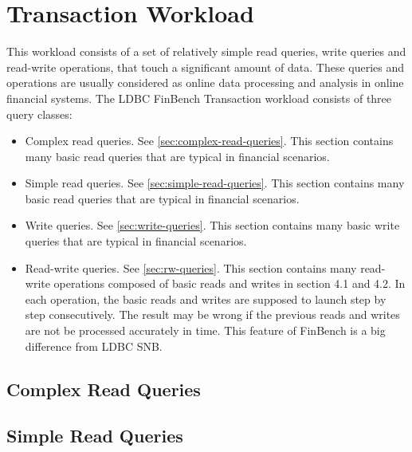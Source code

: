 \chapter{Transaction Workload}
\label{sec:transaction-workload}

This workload consists of a set of relatively simple read queries, write queries
and read-write operations, that touch a significant amount of data. These
queries and operations are usually considered as online data processing and
analysis in online financial systems. The LDBC FinBench Transaction workload consists of three query classes: 
\begin{itemize}
    \item Complex read queries. See \autoref{sec:complex-read-queries}. This section contains many basic read
    queries that are typical in financial scenarios.
    \item Simple read queries. See \autoref{sec:simple-read-queries}. This section contains many basic read
    queries that are typical in financial scenarios.
    \item Write queries. See \autoref{sec:write-queries}. This section contains many basic
    write queries that are typical in financial scenarios.
    \item Read-write queries. See \autoref{sec:rw-queries}. This section contains many
    read-write operations composed of basic reads and writes in section 4.1 and
    4.2. In each operation, the basic reads and writes are supposed to launch
    step by step consecutively. The result may be wrong if the previous reads
    and writes are not be processed accurately in time. This feature of FinBench
    is a big difference from LDBC SNB.
\end{itemize}

\section{Complex Read Queries}
\label{sec:complex-read-queries}




\section{Simple Read Queries}
\label{sec:simple-read-queries}


